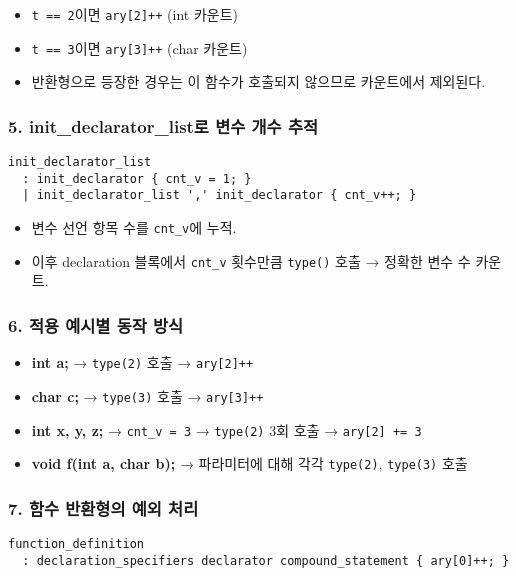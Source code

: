 \documentclass{article}
\begin{document}
\begin{itemize}
  \item \texttt{t == 2}이면 \texttt{ary[2]++} (int 카운트)
  \item \texttt{t == 3}이면 \texttt{ary[3]++} (char 카운트)
  \item 반환형으로 등장한 경우는 이 함수가 호출되지 않으므로 카운트에서 제외된다.
\end{itemize}

\subsubsection*{5. init\_declarator\_list로 변수 개수 추적}

\begin{lstlisting}
init_declarator_list
  : init_declarator { cnt_v = 1; }
  | init_declarator_list ',' init_declarator { cnt_v++; }
\end{lstlisting}

\begin{itemize}
  \item 변수 선언 항목 수를 \texttt{cnt\_v}에 누적.
  \item 이후 declaration 블록에서 \texttt{cnt\_v} 횟수만큼 \texttt{type()} 호출 → 정확한 변수 수 카운트.
\end{itemize}

\subsubsection*{6. 적용 예시별 동작 방식}

\begin{itemize}
  \item \textbf{int a;} → \texttt{type(2)} 호출 → \texttt{ary[2]++}
  \item \textbf{char c;} → \texttt{type(3)} 호출 → \texttt{ary[3]++}
  \item \textbf{int x, y, z;} → \texttt{cnt\_v = 3} → \texttt{type(2)} 3회 호출 → \texttt{ary[2] += 3}
  \item \textbf{void f(int a, char b);} → 파라미터에 대해 각각 \texttt{type(2)}, \texttt{type(3)} 호출
\end{itemize}

\subsubsection*{7. 함수 반환형의 예외 처리}

\begin{lstlisting}
function_definition
  : declaration_specifiers declarator compound_statement { ary[0]++; }
\end{lstlisting}
\end{document}
